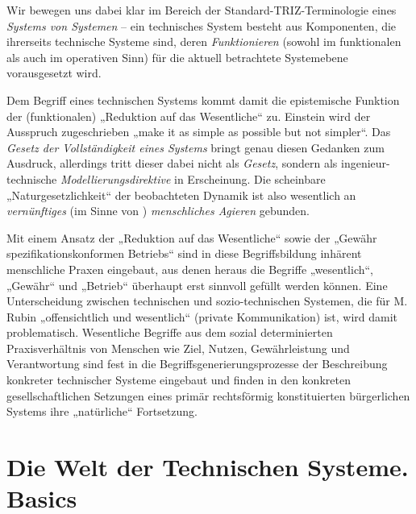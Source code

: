 \documentclass[12pt,a4paper]{article}
\begin{document}
Wir bewegen uns dabei klar im Bereich der Standard-TRIZ-Terminologie eines
\emph{Systems von Systemen} -- ein technisches System besteht aus Komponenten,
die ihrerseits technische Systeme sind, deren \emph{Funktionieren} (sowohl im
funktionalen als auch im operativen Sinn) für die aktuell betrachtete
Systemebene vorausgesetzt wird.

Dem Begriff eines technischen Systems kommt damit die epistemische Funktion
der (funktionalen) „Reduktion auf das Wesentliche“ zu.  Einstein wird der
Ausspruch zugeschrieben „make it as simple as possible but not simpler“. Das
\emph{Gesetz der Vollständigkeit eines Systems} bringt genau diesen Gedanken
zum Ausdruck, allerdings tritt dieser dabei nicht als \emph{Gesetz}, sondern
als ingenieur-technische \emph{Modellierungsdirektive} in Erscheinung.  Die
scheinbare „Naturgesetzlichkeit“ der beobachteten Dynamik ist also wesentlich
an \emph{vernünftiges} (im Sinne von \cite{Vernadsky2001}) \emph{menschliches
  Agieren} gebunden.

Mit einem Ansatz der „Reduktion auf das Wesentliche“ sowie der „Gewähr
spezifikationskonformen Betriebs“ sind in diese Begriffsbildung inhärent
menschliche Praxen eingebaut, aus denen heraus die Begriffe „wesentlich“,
„Gewähr“ und „Betrieb“ überhaupt erst sinnvoll gefüllt werden können.  Eine
Unterscheidung zwischen technischen und sozio-technischen Systemen, die für
M. Rubin „offensichtlich und wesentlich“ (private Kommunikation) ist, wird
damit problematisch. Wesentliche Begriffe aus dem sozial determinierten
Praxisverhältnis von Menschen wie Ziel, Nutzen, Gewährleistung und
Verantwortung sind fest in die Begriffsgenerierungsprozesse der Beschreibung
konkreter technischer Systeme eingebaut und finden in den konkreten
gesellschaftlichen Setzungen eines primär rechtsförmig konstituierten
bürgerlichen Systems ihre „natürliche“ Fortsetzung.

\section{Die Welt der Technischen Systeme. Basics}
\end{document}

